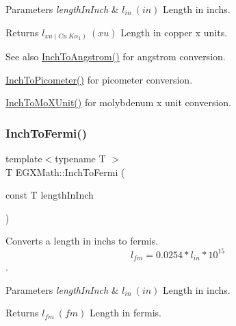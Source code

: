 \begin{DoxyParams}{Parameters}
{\em length\+In\+Inch} & $ l_{in}\ (in)$ Length in inchs. \\
\hline
\end{DoxyParams}
\begin{DoxyReturn}{Returns}
$ l_{xu(Cu\ K\alpha_1)}\ (xu)$ Length in copper x units. 
\end{DoxyReturn}
\begin{DoxySeeAlso}{See also}
\mbox{\hyperlink{group___e_g_x_math-_conversions-_length_conversions-_imperial-_inch-_non-_s_i_ga37c2030e31292fe77b024bffaf4c7f9b}{Inch\+To\+Angstrom()}} for angstrom conversion. 

\mbox{\hyperlink{group___e_g_x_math-_conversions-_length_conversions-_imperial-_inch-_s_i_ga4220728877d0369e359689a0d8f8207c}{Inch\+To\+Picometer()}} for picometer conversion. 

\mbox{\hyperlink{group___e_g_x_math-_conversions-_length_conversions-_imperial-_inch-_non-_s_i_ga938a029b99c57c1b765ebf23e82dee6e}{Inch\+To\+Mo\+X\+Unit()}} for molybdenum x unit conversion. 
\end{DoxySeeAlso}
\mbox{\label{group___e_g_x_math-_conversions-_length_conversions-_imperial-_inch-_non-_s_i_ga60087eace30a405617328d7c3ac3efb3}} 
\subsubsection{\texorpdfstring{Inch\+To\+Fermi()}{InchToFermi()}}
{\footnotesize\ttfamily template$<$typename T $>$ \\
T E\+G\+X\+Math\+::\+Inch\+To\+Fermi (\begin{DoxyParamCaption}\item[{const T}]{length\+In\+Inch }\end{DoxyParamCaption})}



Converts a length in inchs to fermis. \[ l_{fm}=0.0254 * l_{in} * 10^{15} \]. 


\begin{DoxyParams}{Parameters}
{\em length\+In\+Inch} & $ l_{in}\ (in)$ Length in inchs. \\
\hline
\end{DoxyParams}
\begin{DoxyReturn}{Returns}
$ l_{fm}\ (fm)$ Length in fermis. 
\end{DoxyReturn}
\mbox{\label{group___e_g_x_math-_conversions-_length_conversions-_imperial-_inch-_non-_s_i_ga28d3076041cdf54ce5c25f834fb16128}} 
